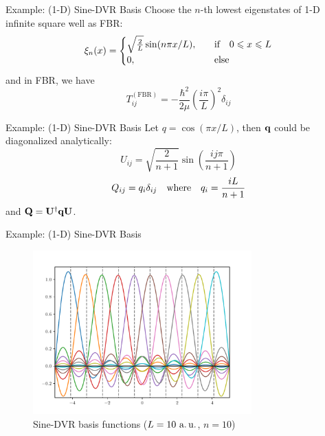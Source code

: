 \documentclass[12pt]{beamer}
\begin{document}
    \begin{frame}{Example: (1-D) Sine-DVR Basis}
        Choose the $n$-th lowest eigenstates of 1-D infinite square well as FBR:
        \begin{equation*}
            \xi_n(x) =
            \begin{cases}
                \sqrt{\frac{2}{L}} \sin(n \pi x / L),
                    &\qif 0 \leqslant x \leqslant L\\
                0,
                    &\qelse
            \end{cases}
        \end{equation*}
        and in FBR, we have
        \begin{equation*}
            T_{ij}^{(\text{FBR})} =
            -\frac{\hbar^2}{2\mu} \left(\frac{i\pi}{L}\right)^2\delta_{ij}
        \end{equation*}
    \end{frame}

    \begin{frame}{Example: (1-D) Sine-DVR Basis}
        Let $q = \cos(\pi x/L)$, then $\vb{q}$ could be diagonalized analytically:
        \begin{equation*}
            U_{ij} = \sqrt{\frac{2}{n+1}}\sin(\frac{ij\pi}{n+1})
        \end{equation*}
        \begin{equation*}
            Q_{ij} = q_i \delta_{ij} \qq{where} q_i = \frac{iL}{n+1}
        \end{equation*}
        and $\vb{Q} = \vb{U}^\dagger \vb{q} \vb{U}$.
    \end{frame}

    \begin{frame}{Example: (1-D) Sine-DVR Basis}
        \begin{figure}
            \includegraphics[width=0.75\textwidth]{dvr_functions-FastSineDVR.pdf}
            \caption{Sine-DVR basis functions ($L = 10~\text{a.\,u.}$, $n = 10$)}
        \end{figure}
    \end{frame}
\end{document}
